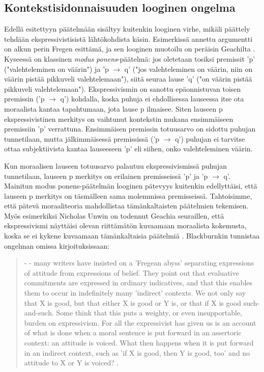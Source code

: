 \documentclass[a4paper,12pt,times,titlepage,finnish]{article}
\begin{document}
\subsection{Kontekstisidonnaisuuden looginen ongelma}

Edellä esitettyyn päätelmään sisältyy kuitenkin looginen virhe, mikäli päättely tehdään ekspressivistisistä läh\-tö\-koh\-dis\-ta käsin. Esimerkissä annettu argumentti on alkun perin Fregen esittämä, ja sen looginen muotoilu on peräisin Geachilta \citep[ks.][]{Geach65}. Kyseessä on klassinen {\it modus ponens}-päätelmä: jos oletetaan tosiksi premissit 'p' ("valehteleminen on väärin") ja 'p \(\rightarrow\) q' ("jos valehteleminen on väärin, niin on väärin pistää pikkuveli valehtelemaan"), siitä seuraa lause 'q' ("on väärin pistää pikkuveli valehtelemaan"). Ekspressivismin on sanottu epäonnistuvan toisen premissin ('p \(\rightarrow\) q') kohdalla, koska puhuja ei ehdollisessa lauseessa itse ota moraalista kantaa tapahtumaan, jota lause p ilmaisee. Siten lauseen p ekspressivistinen merkitys on vaihtunut kontekstin mukana ensimmäiseen premissiin 'p' verrattuna. Ensimmäisen premissin totuusarvo on sidottu puhujan tunnetilaan, mutta jälkimmäisessä premississä ('p \(\rightarrow\) q') puhujan ei tarvitse ottaa subjektiivista kantaa lauseeseen 'p' eli siihen, onko valehteleminen väärin. 

Kun moraalisen lauseen totuusarvo palautuu ekspressivismissä puhujan tunnetilaan, lauseen p merkitys on erilainen premisseissä 'p' ja 'p \(\rightarrow\) q'.  Mainitun modus ponens-päätelmän looginen pätevyys kuitenkin edellyttäisi, että lauseen p merkitys on täsmälleen sama molemmissa premisseissä. Tahtoisimme, että pä\-te\-vä moraaliteoria mahdollistaa tä\-mänkaltaisten päätelmien tekemisen. Myös esimerkiksi Nic\-holas Unwin on todennut Geachia seuraillen, että ekspressivismi näyttäisi olevan riittämätön kuvaamaan moraalista kokemusta, koska se ei kykene kuvaamaan tä\-mänkaltaisia päätelmiä \citep[338]{Unwin99}. 
Blackburnkin tunnistaa ongelman omissa kirjoituksissaan:

\begin{quote}
	- - many writers have insisted on a 'Fregean abyss' separating expressions of attitude from expressions of belief. They point out that evaluative commitments are expressed in ordinary indicatives, and that this enables them to occur in indefinitely many 'indirect' contexts. We not only say that X is good, but that either X is good or Y is, or that if X is good such-and-such. Some think that this puts a weighty, or even insupportable, burden on expressivism. For all the expressivist has given us is an account of what is done when a moral sentence is put forward in an assertoric context: an attitude is voiced. What then happens when it is put forward in an indirect context, such as 'if X is good, then Y is good, too' and no attitude to X or Y is voiced?  \citep[70]{Blackburn98}.
\end{quote}
\end{document}
